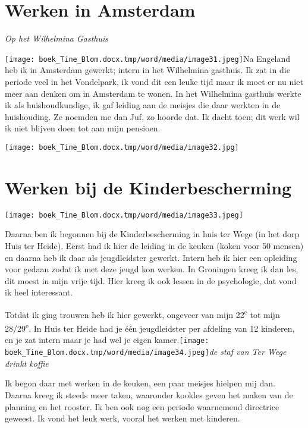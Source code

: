 \documentclass{scrbook}
\begin{document}
{\chapter{\label{ref-007}Werken in Amsterdam}

\textit{Op het Wilhelmina Gasthuis }



 \texttt{[image: boek\_Tine\_Blom.docx.tmp/word/media/image31.jpeg]}Na Engeland heb ik in Amsterdam gewerkt; intern in het Wilhelmina gasthuis. Ik zat in die periode veel in het Vondelpark, ik vond dit een leuke tijd maar ik moet er nu niet meer aan denken om in Amsterdam te wonen. In het Wilhelmina gasthuis werkte ik als huishoudkundige, ik gaf leiding aan de meisjes die daar werkten in de huishouding. Ze noemden me dan Juf, zo hoorde dat. Ik dacht toen; dit werk wil ik niet blijven doen tot aan mijn pensioen.

\texttt{[image: boek\_Tine\_Blom.docx.tmp/word/media/image32.jpg]}

\chapter{\label{ref-008}Werken bij de Kinderbescherming}

\texttt{[image: boek\_Tine\_Blom.docx.tmp/word/media/image33.jpeg]}

Daarna ben ik begonnen bij de Kinderbescherming in huis ter Wege (in het dorp Huis ter Heide). Eerst had ik hier de leiding in de keuken (koken voor 50 mensen) en daarna heb ik daar als jeugdleidster gewerkt. Intern heb ik hier een opleiding voor gedaan zodat ik met deze jeugd kon werken. In Groningen kreeg ik dan les, dit moest in mijn vrije tijd. Hier kreeg ik ook lessen in de psychologie, dat vond ik heel interessant. 

Totdat ik ging trouwen heb ik hier gewerkt, ongeveer van mijn 22\textsuperscript{e} tot mijn 28/29\textsuperscript{e}. In Huis ter Heide had je \'{e}\'{e}n jeugdleidster per afdeling van 12 kinderen, en je zat intern maar je had wel je eigen kamer.\texttt{[image: boek\_Tine\_Blom.docx.tmp/word/media/image34.jpeg]}\textit{de staf van Ter Wege drinkt koffie }



 

Ik begon daar met werken in de keuken, een paar meisjes hielpen mij dan. Daarna kreeg ik steeds meer taken, waaronder kookles geven het maken van de planning en het rooster. Ik ben ook nog een periode waarnemend directrice geweest. Ik vond het leuk werk, vooral het werken met kinderen. 

}
\end{document}
